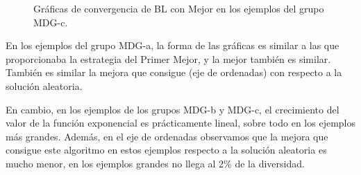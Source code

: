 \documentclass{article}
\begin{document}
\begin{figure}[H]
	\caption{Gráficas de convergencia de BL con Mejor en los ejemplos del grupo MDG-c.}
	\label{fig:graph-bl-best-c}
\end{figure}

En los ejemplos del grupo MDG-a, la forma de las gráficas es similar a las que proporcionaba la estrategia del Primer Mejor, y 
la mejor también es similar. También es similar la mejora que consigue (eje de ordenadas) con respecto a la solución aleatoria.

En cambio, en los ejemplos de los grupos MDG-b y MDG-c, el crecimiento del valor de la función exponencial es prácticamente lineal,
sobre todo en los ejemplos más grandes. Además, en el eje de ordenadas observamos que la mejora que consigue este algoritmo en 
estos ejemplos respecto a la solución aleatoria es mucho menor, en los ejemplos grandes no llega al 2\% de la diversidad.
\end{document}
